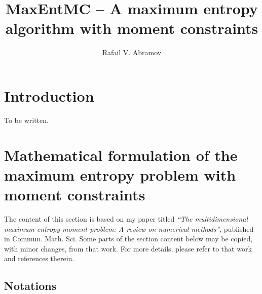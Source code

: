 \documentclass[12pt]{amsart}
\numberwithin{equation}{section}
\begin{document}
\title{MaxEntMC -- A maximum entropy algorithm with moment
constraints}

\author{Rafail V. Abramov}

\maketitle

\tableofcontents

\section{Introduction}

To be written.

\section{Mathematical formulation of the maximum entropy problem
with moment constraints}

The content of this section is based on my paper titled {\em ``The
  multidimensional maximum entropy moment problem: A review on
  numerical methods''}, published in Commun. Math. Sci. Some parts of
the section content below may be copied, with minor changes, from that
work. For more details, please refer to that work and references
therein.

\subsection{Notations}
\end{document}
